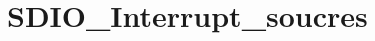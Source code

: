 \hypertarget{group___s_d_i_o___interrupt__soucres}{\section{S\-D\-I\-O\-\_\-\-Interrupt\-\_\-soucres}
\label{group___s_d_i_o___interrupt__soucres}
}
